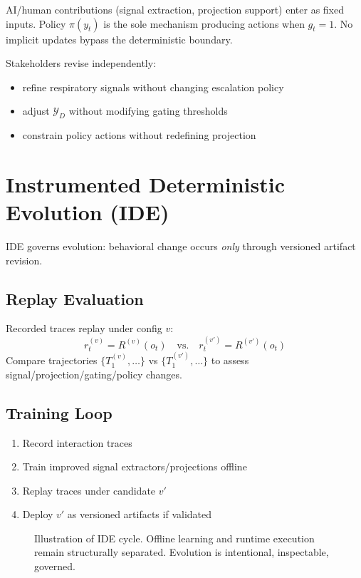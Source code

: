\documentclass[11pt]{article}
\begin{document}
AI/human contributions (signal extraction, projection support) enter as fixed inputs. Policy $\pi(y_t)$ is the sole mechanism producing actions when $g_t = 1$. No implicit updates bypass the deterministic boundary.

Stakeholders revise independently:
\begin{itemize}
\item refine respiratory signals without changing escalation policy
\item adjust $\mathcal{Y}_D$ without modifying gating thresholds  
\item constrain policy actions without redefining projection
\end{itemize}

\section{Instrumented Deterministic Evolution (IDE)}
\label{sec:IDE}

IDE governs evolution: behavioral change occurs \emph{only} through versioned artifact revision.

\subsection{Replay Evaluation}
Recorded traces replay under config $v$:
\[
r_t^{(v)} = R^{(v)}(o_t) \quad \text{vs.} \quad r_t^{(v')} = R^{(v')}(o_t)
\]
Compare trajectories $\{T_1^{(v)}, \dots\}$ vs $\{T_1^{(v')}, \dots\}$ to assess signal/projection/gating/policy changes.

\subsection{Training Loop}
\begin{enumerate}
\item Record interaction traces
\item Train improved signal extractors/projections offline
\item Replay traces under candidate $v'$
\item Deploy $v'$ as versioned artifacts if validated
\end{enumerate}

\begin{figure}[H]
\centering

\caption{Illustration of IDE cycle. Offline learning and runtime execution remain structurally separated. Evolution is intentional, inspectable, governed.}
\label{fig:esm-learning-loop}
\end{figure}
\end{document}
